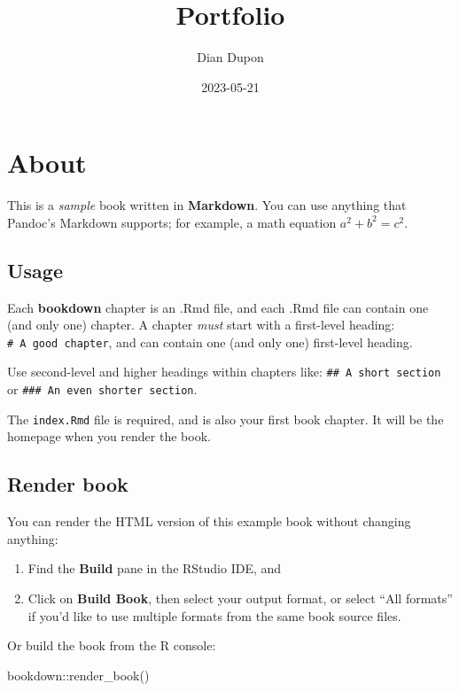 \documentclass[
]{book}
\title{Portfolio}
\author{Dian Dupon}
\date{2023-05-21}
\newenvironment{Shaded}{\begin{snugshade}}{\end{snugshade}}
\newcommand{\FunctionTok}[1]{\textcolor[rgb]{0.00,0.00,0.00}{#1}}
\newcommand{\NormalTok}[1]{#1}
\newcommand{\SpecialCharTok}[1]{\textcolor[rgb]{0.00,0.00,0.00}{#1}}
\begin{document}
\maketitle

{
\setcounter{tocdepth}{1}
\tableofcontents
}
\hypertarget{about}{%
\chapter{About}\label{about}}

This is a \emph{sample} book written in \textbf{Markdown}. You can use anything that Pandoc's Markdown supports; for example, a math equation \(a^2 + b^2 = c^2\).

\hypertarget{usage}{%
\section{Usage}\label{usage}}

Each \textbf{bookdown} chapter is an .Rmd file, and each .Rmd file can contain one (and only one) chapter. A chapter \emph{must} start with a first-level heading: \texttt{\#\ A\ good\ chapter}, and can contain one (and only one) first-level heading.

Use second-level and higher headings within chapters like: \texttt{\#\#\ A\ short\ section} or \texttt{\#\#\#\ An\ even\ shorter\ section}.

The \texttt{index.Rmd} file is required, and is also your first book chapter. It will be the homepage when you render the book.

\hypertarget{render-book}{%
\section{Render book}\label{render-book}}

You can render the HTML version of this example book without changing anything:

\begin{enumerate}
\def\labelenumi{\arabic{enumi}.}
\item
  Find the \textbf{Build} pane in the RStudio IDE, and
\item
  Click on \textbf{Build Book}, then select your output format, or select ``All formats'' if you'd like to use multiple formats from the same book source files.
\end{enumerate}

Or build the book from the R console:

\begin{Shaded}
\begin{Highlighting}[]
\NormalTok{bookdown}\SpecialCharTok{::}\FunctionTok{render\_book}\NormalTok{()}
\end{Highlighting}
\end{Shaded}
\end{document}

